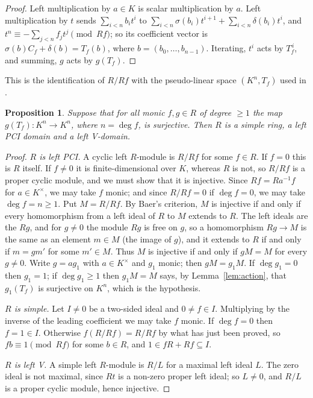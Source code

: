 \documentclass[11pt]{amsart}
\theoremstyle{plain}
\newtheorem{proposition}[theorem]{Proposition}
\theoremstyle{definition}
\theoremstyle{remark}
\begin{document}
\begin{proof}
Left multiplication by $a\in K$ is scalar multiplication by $a$. Left multiplication by $t$ sends $\sum_{i<n}b_it^i$ to $\sum_{i<n}\sigma(b_i)t^{i+1}+\sum_{i<n}\delta(b_i)t^i$, and $t^n\equiv-\sum_{j<n}f_jt^j\pmod{Rf}$; so its coefficient vector is $\sigma(b)C_f+\delta(b)=T_f(b)$, where $b=(b_0,\dots,b_{n-1})$. Iterating, $t^i$ acts by $T_f^{\,i}$, and summing, $g$ acts by $g(T_f)$.
\end{proof}

This is the identification of $R/Rf$ with the pseudo-linear space $(K^n,T_f)$ used in \cite[\S4]{JLL09}.

\begin{proposition}\label{prop:criterion}
Suppose that for all monic $f,g\in R$ of degree $\ge1$ the map $g(T_f)\colon K^n\to K^n$, where $n=\deg f$, is surjective. Then $R$ is a simple ring, a left PCI domain and a left V-domain.
\end{proposition}

\begin{proof}
\emph{$R$ is left PCI.} A cyclic left $R$-module is $R/Rf$ for some $f\in R$. If $f=0$ this is $R$ itself. If $f\ne0$ it is finite-dimensional over $K$, whereas $R$ is not, so $R/Rf$ is a proper cyclic module, and we must show that it is injective. Since $Rf=Ra^{-1}f$ for $a\in K^\times$, we may take $f$ monic; and since $R/Rf=0$ if $\deg f=0$, we may take $\deg f=n\ge1$. Put $M=R/Rf$. By Baer's criterion, $M$ is injective if and only if every homomorphism from a left ideal of $R$ to $M$ extends to $R$. The left ideals are the $Rg$, and for $g\ne0$ the module $Rg$ is free on $g$, so a homomorphism $Rg\to M$ is the same as an element $m\in M$ (the image of $g$), and it extends to $R$ if and only if $m=gm'$ for some $m'\in M$. Thus $M$ is injective if and only if $gM=M$ for every $g\ne0$. Write $g=ag_1$ with $a\in K^\times$ and $g_1$ monic; then $gM=g_1M$. If $\deg g_1=0$ then $g_1=1$; if $\deg g_1\ge1$ then $g_1M=M$ says, by Lemma~\ref{lem:action}, that $g_1(T_f)$ is surjective on $K^n$, which is the hypothesis.

\emph{$R$ is simple.} Let $I\ne0$ be a two-sided ideal and $0\ne f\in I$. Multiplying by the inverse of the leading coefficient we may take $f$ monic. If $\deg f=0$ then $f=1\in I$. Otherwise $f(R/Rf)=R/Rf$ by what has just been proved, so $fb\equiv1\pmod{Rf}$ for some $b\in R$, and $1\in fR+Rf\subseteq I$.

\emph{$R$ is left V.} A simple left $R$-module is $R/L$ for a maximal left ideal $L$. The zero ideal is not maximal, since $Rt$ is a non-zero proper left ideal; so $L\ne0$, and $R/L$ is a proper cyclic module, hence injective.
\end{proof}
\end{document}
